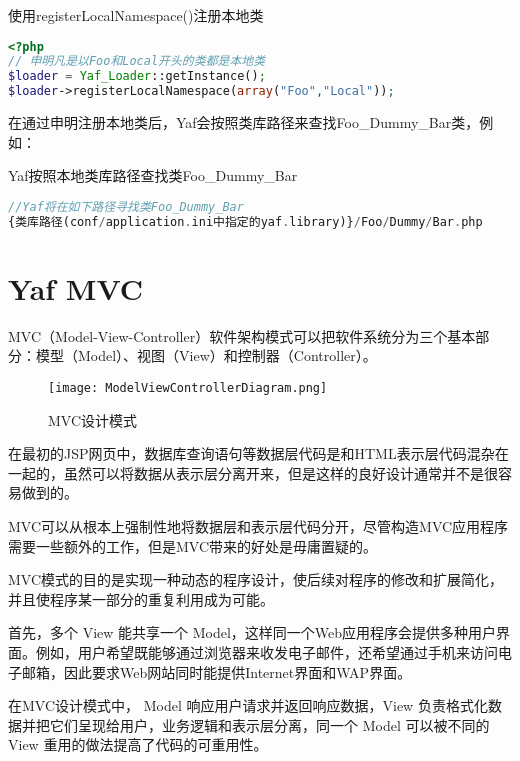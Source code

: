 \begin{example}
使用registerLocalNamespace()注册本地类
\begin{lstlisting}[language=PHP]
<?php
// 申明凡是以Foo和Local开头的类都是本地类
$loader = Yaf_Loader::getInstance();
$loader->registerLocalNamespace(array("Foo","Local"));
\end{lstlisting}
\end{example}

在通过申明注册本地类后，Yaf会按照类库路径来查找Foo\_Dummy\_Bar类，例如：

\begin{example}
Yaf按照本地类库路径查找类Foo\_Dummy\_Bar
\begin{lstlisting}[language=PHP]
//Yaf将在如下路径寻找类Foo_Dummy_Bar
{类库路径(conf/application.ini中指定的yaf.library)}/Foo/Dummy/Bar.php
\end{lstlisting}
\end{example}



\chapter{Yaf MVC}

MVC（Model-View-Controller）软件架构模式可以把软件系统分为三个基本部分：模型（Model）、视图（View）和控制器（Controller）。

\begin{figure}[htbp]
\centering
\texttt{[image: ModelViewControllerDiagram.png]}
\caption{MVC设计模式}
\end{figure}

在最初的JSP网页中，数据库查询语句等数据层代码是和HTML表示层代码混杂在一起的，虽然可以将数据从表示层分离开来，但是这样的良好设计通常并不是很容易做到的。

MVC可以从根本上强制性地将数据层和表示层代码分开，尽管构造MVC应用程序需要一些额外的工作，但是MVC带来的好处是毋庸置疑的。

MVC模式的目的是实现一种动态的程序设计，使后续对程序的修改和扩展简化，并且使程序某一部分的重复利用成为可能。

首先，多个 View 能共享一个 Model，这样同一个Web应用程序会提供多种用户界面。例如，用户希望既能够通过浏览器来收发电子邮件，还希望通过手机来访问电子邮箱，因此要求Web网站同时能提供Internet界面和WAP界面。

在MVC设计模式中， Model 响应用户请求并返回响应数据，View 负责格式化数据并把它们呈现给用户，业务逻辑和表示层分离，同一个 Model 可以被不同的 View 重用的做法提高了代码的可重用性。

